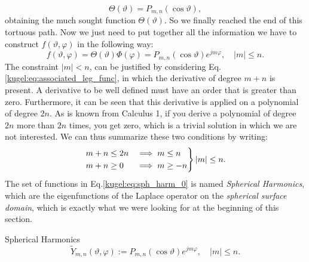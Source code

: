 \begin{equation*}
    \Theta(\vartheta) = P_{m,n}(\cos \vartheta),
\end{equation*}
obtaining the much sought function $\Theta(\vartheta)$. \newline
So we finally reached the end of this tortuous path. Now we just need to put together all the information we have to construct $f(\vartheta, \varphi)$ in the following way:
\begin{equation}\label{kugel:eq:sph_harm_0}
    f(\vartheta, \varphi) = \Theta(\vartheta)\Phi(\varphi) = P_{m,n}(\cos \vartheta)e^{jm\varphi}, \quad |m|\leq n.
\end{equation}
The constraint $|m|<n$, can be justified by considering Eq.\eqref{kugel:eq:associated_leg_func}, in which the derivative of degree $m+n$ is present. A derivative to be well defined must have an order that is greater than zero. Furthermore, it can be seen that this derivative is applied on a polynomial of degree $2n$. As is known from Calculus 1, if you derive a polynomial of degree $2n$ more than $2n$ times, you get zero, which is a trivial solution in which we are not interested.\newline
We can thus summarize these two conditions by writing:
\begin{equation*}
    \begin{rcases}
        m+n \leq 2n &\implies m \leq n \\
        m+n \geq 0  &\implies  m \geq -n
    \end{rcases} |m| \leq n.
\end{equation*}
The set of functions in Eq.\eqref{kugel:eq:sph_harm_0} is named \emph{Spherical Harmonics}, which are the eigenfunctions of the Laplace operator on the \emph{spherical surface domain}, which is exactly what we were looking for at the beginning of this section.
\begin{definition}{Spherical Harmonics}
    \begin{equation}\label{kugel:eq:sph_harm_1}
    \tilde{Y}_{m,n}(\vartheta, \varphi) := P_{m,n}(\cos \vartheta)e^{jm\varphi}, \quad |m|\leq n.
    \end{equation}
\end{definition}

